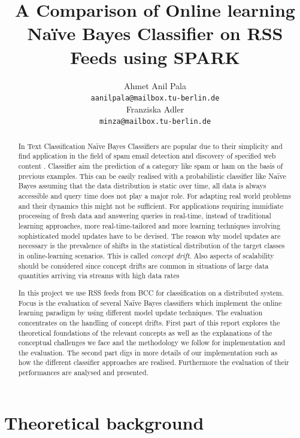 \documentclass{article} %
\title{A Comparison of Online learning Na\"ive Bayes Classifier on RSS Feeds using SPARK}
\author{
Ahmet Anil Pala\\
\texttt{aanilpala@mailbox.tu-berlin.de} \\
\And
Franziska Adler \\
\texttt{minza@mailbox.tu-berlin.de} \\
}
\begin{document}
\maketitle

\begin{abstract}
In Text Classification Na\"ive Bayes Classifiers are popular due to their simplicity and find application in the field of spam email detection and discovery of specified web content \cite[p. 225]{ertel2008}. Classifier aim the prediction of a category like spam or ham on the basis of previous examples. This can be easily realised with a probabilistic classifier like Na\"ive Bayes assuming that the data distribution is static over time, all data is always accessible and query time does not play a major role. For adapting real world problems and their dynamics this might not be sufficient. For applications requiring immidiate processing of fresh data and answering queries in real-time, instead of traditional learning approaches, more real-time-tailored and more learning techniques involving sophisticated model updates have to be devised. The reason why model updates are necessary is the prevalence of shifts in the statistical distribution of the target classes in online-learning scenarios. This is called \textit{concept drift}. Also aspects of scalability should be considered since concept drifts are common in situations of large data quantities arriving via streams with high data rates \cite[p. 4]{tsymbal2004}   

In this project we use RSS feeds from BCC for classification on a distributed system. Focus is the evaluation of several Na\"ive Bayes classifiers which implement the online learning paradigm by using different model update techniques.  The evaluation concentrates on the handling of concept drifts. First part of this report explores the theoretical foundations of the relevant concepts as well as the explanations of the conceptual challenges we face and the methodology we follow for implementation and the evaluation. The second part digs in more details of our implementation such as how the different classifier approaches are realised. Furthermore the evaluation of their performances are analysed and presented.

\end{abstract}

\section{Theoretical background}
\end{document}
